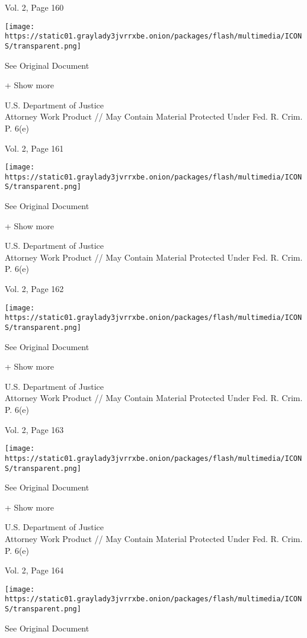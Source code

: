 Vol. 2, Page 160

\protect\hyperlink{}{}

\texttt{[image: https://static01.graylady3jvrrxbe.onion/packages/flash/multimedia/ICONS/transparent.png]}

See Original Document

+ Show more

U.S. Department of Justice\\
Attorney Work Product // May Contain Material Protected Under Fed. R.
Crim. P. 6(e)

Vol. 2, Page 161

\protect\hyperlink{}{}

\texttt{[image: https://static01.graylady3jvrrxbe.onion/packages/flash/multimedia/ICONS/transparent.png]}

See Original Document

+ Show more

U.S. Department of Justice\\
Attorney Work Product // May Contain Material Protected Under Fed. R.
Crim. P. 6(e)

Vol. 2, Page 162

\protect\hyperlink{}{}

\texttt{[image: https://static01.graylady3jvrrxbe.onion/packages/flash/multimedia/ICONS/transparent.png]}

See Original Document

+ Show more

U.S. Department of Justice\\
Attorney Work Product // May Contain Material Protected Under Fed. R.
Crim. P. 6(e)

Vol. 2, Page 163

\protect\hyperlink{}{}

\texttt{[image: https://static01.graylady3jvrrxbe.onion/packages/flash/multimedia/ICONS/transparent.png]}

See Original Document

+ Show more

U.S. Department of Justice\\
Attorney Work Product // May Contain Material Protected Under Fed. R.
Crim. P. 6(e)

Vol. 2, Page 164

\protect\hyperlink{}{}

\texttt{[image: https://static01.graylady3jvrrxbe.onion/packages/flash/multimedia/ICONS/transparent.png]}

See Original Document

